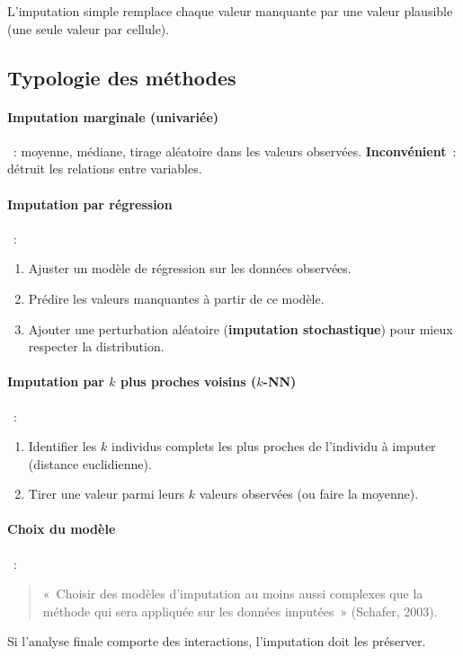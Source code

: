 \documentclass[a4paper,11pt]{article}
\theoremstyle{definition}
\theoremstyle{remark}
\begin{document}
L'imputation simple remplace chaque valeur manquante par une valeur
plausible (une seule valeur par cellule).

\subsection{Typologie des méthodes}

\paragraph{Imputation marginale (univariée)}~:
moyenne, médiane, tirage aléatoire dans les valeurs observées.
\textbf{Inconvénient}~: détruit les relations entre variables.

\paragraph{Imputation par régression}~:
\begin{enumerate}
  \item Ajuster un modèle de régression sur les données observées.
  \item Prédire les valeurs manquantes à partir de ce modèle.
  \item Ajouter une perturbation aléatoire (\textbf{imputation
    stochastique}) pour mieux respecter la distribution.
\end{enumerate}

\paragraph{Imputation par $k$ plus proches voisins ($k$-NN)}~:
\begin{enumerate}
  \item Identifier les $k$ individus complets les plus proches de
    l'individu à imputer (distance euclidienne).
  \item Tirer une valeur parmi leurs $k$ valeurs observées (ou
    faire la moyenne).
\end{enumerate}

\paragraph{Choix du modèle}~:
\begin{quote}
  «~Choisir des modèles d'imputation au moins aussi complexes que la
  méthode qui sera appliquée sur les données imputées~» (Schafer, 2003).
\end{quote}
Si l'analyse finale comporte des interactions, l'imputation doit les
préserver.
\end{document}
